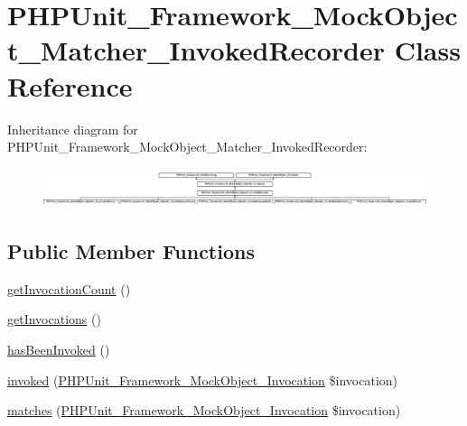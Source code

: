 \hypertarget{class_p_h_p_unit___framework___mock_object___matcher___invoked_recorder}{}\section{P\+H\+P\+Unit\+\_\+\+Framework\+\_\+\+Mock\+Object\+\_\+\+Matcher\+\_\+\+Invoked\+Recorder Class Reference}
\label{class_p_h_p_unit___framework___mock_object___matcher___invoked_recorder}
Inheritance diagram for P\+H\+P\+Unit\+\_\+\+Framework\+\_\+\+Mock\+Object\+\_\+\+Matcher\+\_\+\+Invoked\+Recorder\+:\begin{figure}[H]
\begin{center}
\leavevmode
\includegraphics[height=1.145780cm]{class_p_h_p_unit___framework___mock_object___matcher___invoked_recorder}
\end{center}
\end{figure}
\subsection*{Public Member Functions}
\begin{DoxyCompactItemize}
\item 
\mbox{\hyperlink{class_p_h_p_unit___framework___mock_object___matcher___invoked_recorder_a815caba4d48ea1a37f86fb79460e648f}{get\+Invocation\+Count}} ()
\item 
\mbox{\hyperlink{class_p_h_p_unit___framework___mock_object___matcher___invoked_recorder_ab4b8ec6391b0e816b38554cfcdcf0adb}{get\+Invocations}} ()
\item 
\mbox{\hyperlink{class_p_h_p_unit___framework___mock_object___matcher___invoked_recorder_a5c04b9dfb1208fe2f459f738aae56744}{has\+Been\+Invoked}} ()
\item 
\mbox{\hyperlink{class_p_h_p_unit___framework___mock_object___matcher___invoked_recorder_a63f37b06181c9547bc3c225007c34425}{invoked}} (\mbox{\hyperlink{interface_p_h_p_unit___framework___mock_object___invocation}{P\+H\+P\+Unit\+\_\+\+Framework\+\_\+\+Mock\+Object\+\_\+\+Invocation}} \$invocation)
\item 
\mbox{\hyperlink{class_p_h_p_unit___framework___mock_object___matcher___invoked_recorder_a4988c6fa11e275302172d0a4ae32dd3a}{matches}} (\mbox{\hyperlink{interface_p_h_p_unit___framework___mock_object___invocation}{P\+H\+P\+Unit\+\_\+\+Framework\+\_\+\+Mock\+Object\+\_\+\+Invocation}} \$invocation)
\end{DoxyCompactItemize}
